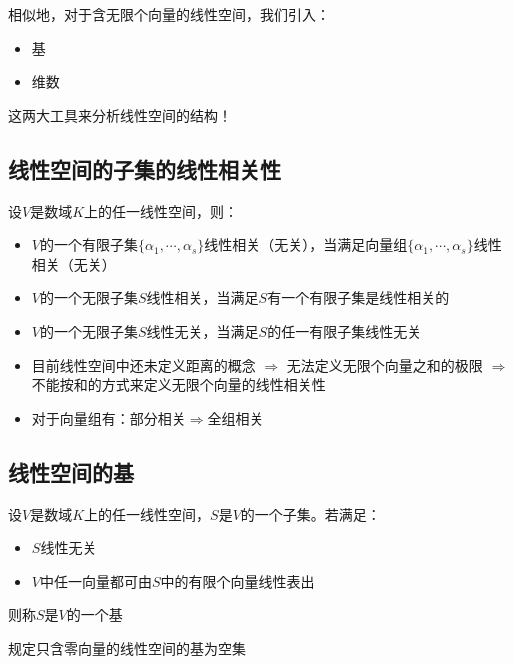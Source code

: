 相似地，对于含无限个向量的线性空间，我们引入：
\begin{itemize}
    \item 基
    \item 维数
\end{itemize}
这两大工具来分析线性空间的结构！

\subsection*{线性空间的子集的线性相关性}
\begin{definition}
    设$V$是数域$K$上的任一线性空间，则：
    \begin{itemize}
        \item $V$的一个有限子集$\{\alpha_1, \cdots, \alpha_s\}$线性相关（无关），当满足向量组$\{\alpha_1, \cdots, \alpha_s\}$线性相关（无关）
        \item $V$的一个无限子集$S$线性相关，当满足$S$有一个有限子集是线性相关的
        \item $V$的一个无限子集$S$线性无关，当满足$S$的任一有限子集线性无关
    \end{itemize}
\end{definition}

\begin{remark}[无限子集线性相关性的说明]
    \begin{itemize}
        \item 目前线性空间中还未定义距离的概念 $\Rightarrow$ 无法定义无限个向量之和的极限 $\Rightarrow$ 不能按和的方式来定义无限个向量的线性相关性
        \item 对于向量组有：部分相关$\Rightarrow$全组相关
    \end{itemize}
\end{remark}

\subsection*{线性空间的基}

\begin{definition}
    设$V$是数域$K$上的任一线性空间，$S$是$V$的一个子集。若满足：
    \begin{itemize}
        \item $S$线性无关
        \item $V$中任一向量都可由$S$中的有限个向量线性表出
    \end{itemize}
    则称$S$是$V$的一个基
\end{definition}
规定只含零向量的线性空间的基为空集

